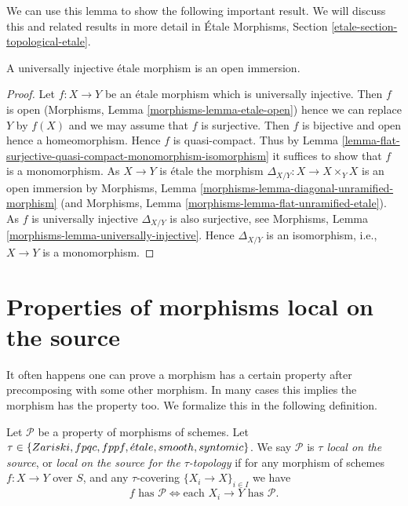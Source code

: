 \noindent
We can use this lemma to show the following important result.
We will discuss this and related results in more detail in
\'Etale Morphisms, Section \ref{etale-section-topological-etale}.

\begin{lemma}
\label{lemma-universally-injective-etale-open-immersion}
A universally injective \'etale morphism is an open immersion.
\end{lemma}

\begin{proof}
Let $f : X \to Y$ be an \'etale morphism which is universally injective.
Then $f$ is open
(Morphisms, Lemma \ref{morphisms-lemma-etale-open})
hence we can replace $Y$ by $f(X)$ and we may assume that $f$ is surjective.
Then $f$ is bijective and open hence a homeomorphism. Hence $f$ is
quasi-compact. Thus by
Lemma \ref{lemma-flat-surjective-quasi-compact-monomorphism-isomorphism}
it suffices to show that $f$ is a monomorphism. As $X \to Y$ is \'etale
the morphism $\Delta_{X/Y} : X \to X \times_Y X$ is an open immersion by
Morphisms, Lemma \ref{morphisms-lemma-diagonal-unramified-morphism}
(and
Morphisms, Lemma \ref{morphisms-lemma-flat-unramified-etale}).
As $f$ is universally injective $\Delta_{X/Y}$ is also surjective, see
Morphisms, Lemma \ref{morphisms-lemma-universally-injective}.
Hence $\Delta_{X/Y}$ is an isomorphism, i.e., $X \to Y$ is a monomorphism.
\end{proof}














\section{Properties of morphisms local on the source}
\label{section-properties-morphisms-local-source}

\noindent
It often happens one can prove a morphism has a certain property
after precomposing with some other morphism. In many cases this
implies the morphism has the property too. We formalize
this in the following definition.

\begin{definition}
\label{definition-property-morphisms-local-source}
Let $\mathcal{P}$ be a property of morphisms of schemes.
Let $\tau \in \{Zariski,\linebreak[0] fpqc,\linebreak[0] fppf,\linebreak[0]
\acute{e}tale,\linebreak[0] smooth,\linebreak[0] syntomic\}$.
We say $\mathcal{P}$ is
{\it $\tau$ local on the source}, or
{\it local on the source for the $\tau$-topology} if for
any morphism of schemes $f : X \to Y$ over $S$, and any
$\tau$-covering $\{X_i \to X\}_{i \in I}$ we
have
$$
f \text{ has }\mathcal{P}
\Leftrightarrow
\text{each }X_i \to Y\text{ has }\mathcal{P}.
$$
\end{definition}

